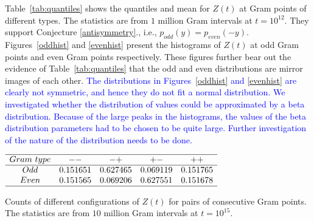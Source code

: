 \documentclass[twoside]{article}
\theoremstyle{definition}
\begin{document}
{Table~\ref{tab:quantiles} shows the quantiles and mean for  $Z(t)$ at Gram points of different types.  The statistics are from $1$ million Gram intervals at $t=10^{12}$. They support 
Conjecture \ref{antisymmetry}., i.e.,  $p_{odd}(y) = p_{even}(-y)$.
Figures~\ref{oddhist} and \ref{evenhist}  present the histograms of $Z(t)$ at odd Gram points and even Gram points respectively. These figures further bear out the evidence of Table~\ref{tab:quantiles} that the odd and even distributions are mirror images of each other. \textcolor{blue}{ The distributions in Figures~\ref{oddhist} and \ref{evenhist} are clearly not symmetric, and hence they do not fit a normal distribution. We investigated whether the distribution of values could be approximated by a beta distribution. Because of the large peaks in the histograms, the values of the beta distribution parameters had to be chosen to be quite large. Further investigation of the nature of the distribution needs to be done.
}

\begin{table}
\centering \(\begin{array}{ccccc}
\hline
 Gram~type&   --   & -+   & +-   & ++  \\
\hline
Odd & 0.151651&0.627465&0.069119&0.151765 \\
Even & 0.151565&0.069206&0.627551&0.151678 \\
\hline
\end{array}\)
\caption{Counts of different configurations of $Z(t)$  for pairs of consecutive Gram points.  The statistics are from $10$ million Gram intervals at $t=10^{15}$.} \label{tab:pairraw}
\end{table}

}
\end{document}
